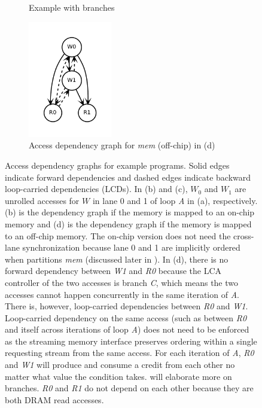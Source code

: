 \begin{figure}
\begin{subfigure}[b]{0.4\textwidth}
\inputminted{python}{code/dep3.py}
\caption{Example with branches}
\end{subfigure}
\begin{subfigure}[b]{0.5\textwidth}
  \centering
\includegraphics[width=0.4\textwidth]{figs/dep3.pdf}
  \caption{Access dependency graph for \emph{mem} (off-chip) in (d)}
\end{subfigure}

\caption[Examples for access dependency graph]{
  Access dependency graphs for example programs. 
  Solid edges indicate forward dependencies and
  dashed edges indicate backward loop-carried dependencies (LCDs).
  In (b) and (c),
  \emph{$W_0$} and \emph{$W_1$} are unrolled accesses for $W$ in lane 0 and 1 of loop \emph{A}
  in (a), respectively.
  (b) is the dependency graph if the memory is mapped to an on-chip memory and (d)
  is the dependency graph if the memory is mapped to an off-chip memory.
  The on-chip version does not need the cross-lane synchronization because 
  lane 0 and 1 are implicitly ordered when \name partitions \emph{mem} 
  (discussed later in ).
  In (d), there is no forward dependency between \emph{W1} and \emph{R0} because the LCA controller of the two accesses is branch \emph{C}, which means the two accesses cannot happen concurrently in
  the same iteration of \emph{A}.
  There is, however, loop-carried dependencies between \emph{R0} and \emph{W1}. 
  Loop-carried
  dependency on the same access (such as between \emph{R0} and itself across iterations of loop \emph{A}) does not need to be enforced as the streaming memory interface preserves ordering
  within a single requesting stream from the same access.
  For each iteration of \emph{A}, \emph{R0} and \emph{W1} will produce and consume a credit from
  each other no matter what value the condition takes. 
   will elaborate more on branches.
  \emph{R0} and \emph{R1} do not depend on each other because they are both DRAM read accesses.
}
\label{fig:depeg}
\end{figure}

